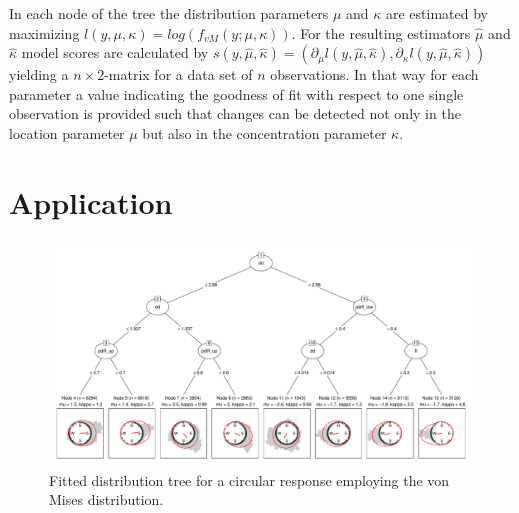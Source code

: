 \documentclass[twoside]{report}
\begin{document}
In each node of the tree the distribution parameters $\mu$ and $\kappa$ are 
estimated by maximizing $l(y, \mu, \kappa) = log(f_{vM}(y;\mu, \kappa))$. 
For the resulting estimators $\hat{\mu}$ and $\hat{\kappa}$ model scores are calculated by  
$s(y,\hat{\mu}, \hat{\kappa}) = (\partial_{\mu} l(y, \hat{\mu}, \hat{\kappa}),
\partial_{\kappa}l(y, \hat{\mu}, \hat{\kappa}))$
yielding a $n \times 2$-matrix for a data set of $n$ observations.
In that way for each parameter a value indicating the goodness of fit with respect to one single 
observation is provided such that changes can be detected not only in the location parameter $\mu$ 
but also in the concentration parameter $\kappa$.





\section{Application}

\begin{figure}[!ht]\centering
\includegraphics[height = .5\textheight,angle=90,origin=c]{circtree_plot_big.pdf}
\caption{Fitted distribution tree for a circular response employing the von Mises distribution.}
\label{fig:tree}
\end{figure}
\end{document}
